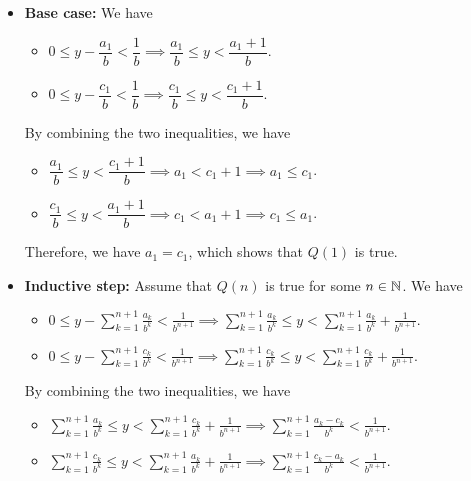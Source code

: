     \begin{itemize}
        \item \textbf{Base case:} We have
        \begin{itemize}
            \item $0 \leq y - \dfrac{a_{1}}{b} < \dfrac{1}{b} \implies \dfrac{a_{1}}{b} \leq y < \dfrac{a_{1} + 1}{b}$.
            \item $0 \leq y - \dfrac{c_{1}}{b} < \dfrac{1}{b} \implies \dfrac{c_{1}}{b} \leq y < \dfrac{c_{1} + 1}{b}$. 
        \end{itemize}
        By combining the two inequalities, we have
        \begin{itemize}
            \item $\dfrac{a_{1}}{b} \leq y < \dfrac{c_{1} + 1}{b} \implies a_{1} < c_{1} + 1 \implies a_{1} \leq c_{1}$.
            \item $\dfrac{c_{1}}{b} \leq y < \dfrac{a_{1} + 1}{b} \implies c_{1} < a_{1} + 1 \implies c_{1} \leq a_{1}$.
        \end{itemize}
        Therefore, we have $a_{1} = c_{1}$, which shows that $Q(1)$ is true.
        \item \textbf{Inductive step:} Assume that $Q(n)$ is true for some $n \in \mathbb{N}$. We have
        \begin{itemize}
            \item $\displaystyle 0 \leq y - \sum_{k = 1}^{n + 1} \frac{a_{k}}{b^{k}} < \frac{1}{b^{n + 1}} \implies
            \sum_{k = 1}^{n + 1} \frac{a_{k}}{b^{k}} \leq y < \sum_{k = 1}^{n + 1} \frac{a_{k}}{b^{k}} + \frac{1}{b^{n + 1}}$.
            \item $\displaystyle 0 \leq y - \sum_{k = 1}^{n + 1} \frac{c_{k}}{b^{k}} < \frac{1}{b^{n + 1}} \implies
            \sum_{k = 1}^{n + 1} \frac{c_{k}}{b^{k}} \leq y < \sum_{k = 1}^{n + 1} \frac{c_{k}}{b^{k}} + \frac{1}{b^{n + 1}}$.
        \end{itemize}
        By combining the two inequalities, we have
        \begin{itemize}
            \item $\displaystyle \sum_{k = 1}^{n + 1} \frac{a_{k}}{b^{k}} \leq y < \sum_{k = 1}^{n + 1} \frac{c_{k}}{b^{k}}
            + \frac{1}{b^{n + 1}} \implies \sum_{k = 1}^{n + 1} \frac{a_{k} - c_{k}}{b^{k}} < \frac{1}{b^{n + 1}}$.
            \item $\displaystyle \sum_{k = 1}^{n + 1} \frac{c_{k}}{b^{k}} \leq y < \sum_{k = 1}^{n + 1} \frac{a_{k}}{b^{k}}
            + \frac{1}{b^{n + 1}} \implies \sum_{k = 1}^{n + 1} \frac{c_{k} - a_{k}}{b^{k}} < \frac{1}{b^{n + 1}}$.

\end{itemize}
\end{itemize}
